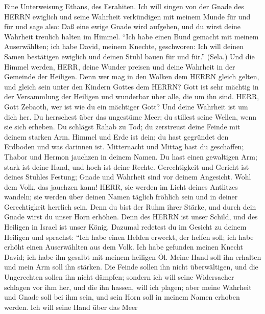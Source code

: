  Eine Unterweisung Ethans, des Esrahiten. Ich will singen
von der Gnade des HERRN ewiglich und seine Wahrheit verkündigen mit
meinem Munde für und für  und sage also: Daß eine ewige
Gnade wird aufgehen, und du wirst deine Wahrheit treulich halten im
Himmel.  ``Ich habe einen Bund gemacht mit meinem
Auserwählten; ich habe David, meinem Knechte, geschworen: 
Ich will deinen Samen bestätigen ewiglich und deinen Stuhl bauen für und
für.'' (Sela.)  Und die Himmel werden, HERR, deine Wunder
preisen und deine Wahrheit in der Gemeinde der Heiligen. 
Denn wer mag in den Wolken dem HERRN gleich gelten, und gleich sein
unter den Kindern Gottes dem HERRN?  Gott ist sehr mächtig
in der Versammlung der Heiligen und wunderbar über alle, die um ihn
sind.  HERR, Gott Zebaoth, wer ist wie du ein mächtiger
Gott? Und deine Wahrheit ist um dich her.  Du herrschest
über das ungestüme Meer; du stillest seine Wellen, wenn sie sich
erheben.  Du schlägst Rahab zu Tod; du zerstreust deine
Feinde mit deinem starken Arm.  Himmel und Erde ist dein;
du hast gegründet den Erdboden und was darinnen ist. 
Mitternacht und Mittag hast du geschaffen; Thabor und Hermon jauchzen in
deinem Namen.  Du hast einen gewaltigen Arm; stark ist
deine Hand, und hoch ist deine Rechte.  Gerechtigkeit und
Gericht ist deines Stuhles Festung; Gnade und Wahrheit sind vor deinem
Angesicht.  Wohl dem Volk, das jauchzen kann! HERR, sie
werden im Licht deines Antlitzes wandeln;  sie werden über
deinen Namen täglich fröhlich sein und in deiner Gerechtigkeit herrlich
sein.  Denn du bist der Ruhm ihrer Stärke, und durch dein
Gnade wirst du unser Horn erhöhen.  Denn des HERRN ist
unser Schild, und des Heiligen in Israel ist unser König. 
Dazumal redetest du im Gesicht zu deinem Heiligen und sprachst: ``Ich
habe einen Helden erweckt, der helfen soll; ich habe erhöht einen
Auserwählten aus dem Volk.  Ich habe gefunden meinen Knecht
David; ich habe ihn gesalbt mit meinem heiligen Öl.  Meine
Hand soll ihn erhalten und mein Arm soll ihn stärken.  Die
Feinde sollen ihn nicht überwältigen, und die Ungerechten sollen ihn
nicht dämpfen;  sondern ich will seine Widersacher schlagen
vor ihm her, und die ihn hassen, will ich plagen;  aber
meine Wahrheit und Gnade soll bei ihm sein, und sein Horn soll in meinem
Namen erhoben werden.  Ich will seine Hand über das Meer
